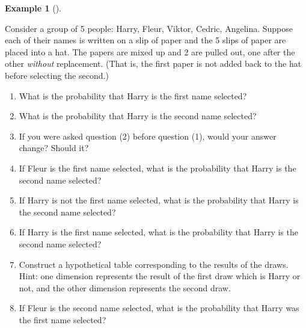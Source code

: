 \documentclass[
  letterpaper,
  DIV=11,
  numbers=noendperiod]{scrreprt}
\providecommand{\tightlist}{%
  \setlength{\itemsep}{0pt}\setlength{\parskip}{0pt}}
\theoremstyle{plain}
\theoremstyle{definition}
\newtheorem{example}{Example}[chapter]
\theoremstyle{definition}
\theoremstyle{definition}
\theoremstyle{remark}
\begin{document}
\begin{tcolorbox}[enhanced jigsaw, opacityback=0, left=2mm, colframe=quarto-callout-note-color-frame, toprule=.15mm, breakable, colback=white, leftrule=.75mm, arc=.35mm, rightrule=.15mm, bottomrule=.15mm]

\begin{example}[]\protect\hypertarget{exm-harry-second}{}\label{exm-harry-second}

Consider a group of 5 people: Harry, Fleur, Viktor, Cedric, Angelina.
Suppose each of their names is written on a slip of paper and the 5
slips of paper are placed into a hat. The papers are mixed up and 2 are
pulled out, one after the other \emph{without} replacement. (That is,
the first paper is not added back to the hat before selecting the
second.)

\begin{enumerate}
\def\labelenumi{\arabic{enumi}.}
\tightlist
\item
  What is the probability that Harry is the first name selected?
\item
  What is the probability that Harry is the second name selected?
\item
  If you were asked question (2) before question (1), would your answer
  change? Should it?
\item
  If Fleur is the first name selected, what is the probability that
  Harry is the second name selected?
\item
  If Harry is not the first name selected, what is the probability that
  Harry is the second name selected?
\item
  If Harry is the first name selected, what is the probability that
  Harry is the second name selected?
\item
  Construct a hypothetical table corresponding to the results of the
  draws. Hint: one dimension represents the result of the first draw
  which is Harry or not, and the other dimension represents the second
  draw.
\item
  If Fleur is the second name selected, what is the probability that
  Harry was the first name selected?
\end{enumerate}

\end{example}

\end{tcolorbox}
\end{document}
